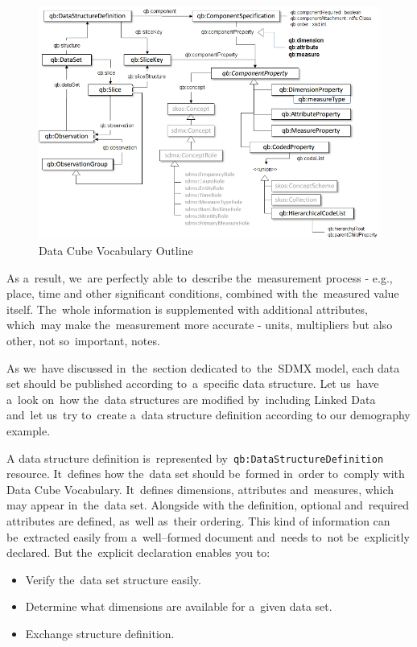 \begin{figure}
	\centering
	\includegraphics[width=150mm]{img/dcv-schema.png}
	\caption{Data Cube Vocabulary Outline~\cite{dcv}}
	\label{fig:lod-cloud}
\end{figure}

As a~result, we~are perfectly able to~describe the~measurement process - e.g., place, time and
other significant conditions, combined with the~measured value itself. The~whole information
is supplemented with additional attributes, which~may make the~measurement more accurate
- units, multipliers but also other, not so~important, notes.

As we~have discussed in~the~section dedicated to~the~SDMX model, each data set should be
published according to~a~specific data structure. Let us~have a~look on~how the~data structures are
modified by~including Linked Data and~let us~try to~create a~data structure definition according
to our demography example.

A data structure definition is~represented by~\texttt{qb:DataStructureDefinition} resource. It~defines
how the~data set should be~formed in~order to~comply with Data Cube Vocabulary. It~defines
dimensions, attributes and~measures, which may appear in~the~data set. Alongside with the
definition, optional and~required attributes are defined, as~well as~their ordering. This kind
of information can be~extracted easily from a~well--formed document and~needs to~not be~explicitly
declared. But the~explicit declaration enables you to:

\begin{itemize}
\item Verify the~data set structure easily.
\item Determine what dimensions are available for a~given data set.
\item Exchange structure definition.
\end{itemize}

